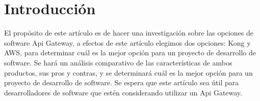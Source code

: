 \section{Introducción}
El propósito de este artículo es de hacer una investigación sobre las
opciones de software Api Gateway, a efectos de este artículo elegimos
dos opciones: Kong y AWS, para determinar cuál es
la mejor opción para un proyecto de desarrollo de software. Se hará un
análisis comparativo de las características de ambos productos, sus pros
y contras, y se determinará cuál es la mejor opción para un proyecto de
desarrollo de software. Se espera que este artículo sea útil para
desarrolladores de software que estén considerando utilizar un Api Gateway.
